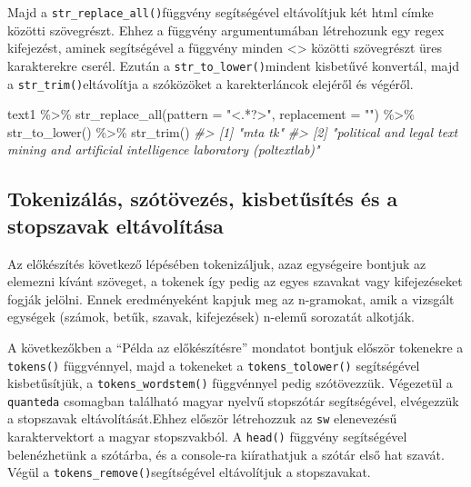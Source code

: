 \documentclass[
]{book}
\newenvironment{Shaded}{\begin{snugshade}}{\end{snugshade}}
\newcommand{\AttributeTok}[1]{\textcolor[rgb]{0.77,0.63,0.00}{#1}}
\newcommand{\CommentTok}[1]{\textcolor[rgb]{0.56,0.35,0.01}{\textit{#1}}}
\newcommand{\FunctionTok}[1]{\textcolor[rgb]{0.00,0.00,0.00}{#1}}
\newcommand{\NormalTok}[1]{#1}
\newcommand{\SpecialCharTok}[1]{\textcolor[rgb]{0.00,0.00,0.00}{#1}}
\newcommand{\StringTok}[1]{\textcolor[rgb]{0.31,0.60,0.02}{#1}}
\begin{document}
Majd a \texttt{str\_replace\_all()}függvény segítségével eltávolítjuk
két html címke közötti szövegrészt. Ehhez a függvény argumentumában
létrehozunk egy regex kifejezést, aminek segítségével a függvény minden
\textless\textgreater{} közötti szövegrészt üres karakterekre cserél.
Ezután a \texttt{str\_to\_lower()}mindent kisbetűvé konvertál, majd a
\texttt{str\_trim()}eltávolítja a szóközöket a karekterláncok elejéről
és végéről.

\begin{Shaded}
\begin{Highlighting}[]

\NormalTok{text1 }\SpecialCharTok{\%\textgreater{}\%}
  \FunctionTok{str\_replace\_all}\NormalTok{(}\AttributeTok{pattern =} \StringTok{"\textless{}.*?\textgreater{}"}\NormalTok{, }\AttributeTok{replacement =} \StringTok{""}\NormalTok{) }\SpecialCharTok{\%\textgreater{}\%}
  \FunctionTok{str\_to\_lower}\NormalTok{() }\SpecialCharTok{\%\textgreater{}\%}
  \FunctionTok{str\_trim}\NormalTok{()}
\CommentTok{\#\textgreater{} [1] "mta tk"                                                                             }
\CommentTok{\#\textgreater{} [2] "political and legal text mining and artificial intelligence laboratory (poltextlab)"}
\end{Highlighting}
\end{Shaded}

\hypertarget{tokenizuxe1luxe1s-szuxf3tuxf6vezuxe9s-kisbetux171suxedtuxe9s-uxe9s-a-stopszavak-eltuxe1voluxedtuxe1sa}{%
\subsection{Tokenizálás, szótövezés, kisbetűsítés és a stopszavak
eltávolítása}\label{tokenizuxe1luxe1s-szuxf3tuxf6vezuxe9s-kisbetux171suxedtuxe9s-uxe9s-a-stopszavak-eltuxe1voluxedtuxe1sa}}

Az előkészítés következő lépésében tokenizáljuk, azaz egységeire bontjuk
az elemezni kívánt szöveget, a tokenek így pedig az egyes szavakat vagy
kifejezéseket fogják jelölni. Ennek eredményeként kapjuk meg az
n-gramokat, amik a vizsgált egységek (számok, betűk, szavak,
kifejezések) n-elemű sorozatát alkotják.

A következőkben a ``Példa az előkészítésre'' mondatot bontjuk először
tokenekre a \texttt{tokens()} függvénnyel, majd a tokeneket a
\texttt{tokens\_tolower()} segítségével kisbetűsítjük, a
\texttt{tokens\_wordstem()} függvénnyel pedig szótövezzük. Végezetül a
\texttt{quanteda} csomagban található magyar nyelvű stopszótár
segítségével, elvégezzük a stopszavak eltávolítását.Ehhez először
létrehozzuk az \texttt{sw} elenevezésű karaktervektort a magyar
stopszvakból. A \texttt{head()} függvény segítségével belenézhetünk a
szótárba, és a console-ra kiírathatjuk a szótár első hat szavát. Végül a
\texttt{tokens\_remove()}segítségével eltávolítjuk a stopszavakat.
\end{document}
